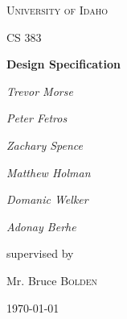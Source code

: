 \documentclass[12pt]{extarticle}
\begin{document}
\begin{titlepage}
	\centering
	{\scshape\LARGE University of Idaho \par}
	\vspace{1cm}
	{\scshape\Large CS 383\par}
	\vspace{1.5cm}
	{\huge\bfseries Design Specification\par}
	\vspace{2cm}
	{\Large\itshape Trevor Morse\par}
	{\Large\itshape Peter Fetros\par}
	{\Large\itshape Zachary Spence\par}
	{\Large\itshape Matthew Holman\par}
	{\Large\itshape Domanic Welker\par}
	{\Large\itshape Adonay Berhe\par}
	\vfill
	supervised by\par
	Mr. Bruce \textsc{Bolden}
	
	\vfill
	
	{\large \today\par}
\end{titlepage}
\tableofcontents
\clearpage








\cleardoublepage
%
%
%
%
%
%
\end{document}
